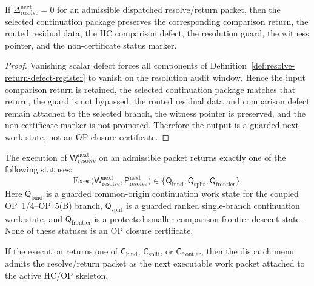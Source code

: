 \begin{lemma}
\label{lem:zero-resolve-return-defect-preserves-selected-continuation-data}
If \(\Delta_{\mathrm{resolve}}^{\mathrm{next}}=0\) for an admissible dispatched resolve/return packet, then the selected continuation package preserves the corresponding comparison return, the routed residual data, the HC comparison defect, the resolution guard, the witness pointer, and the non-certificate status marker.
\end{lemma}

\begin{proof}
Vanishing scalar defect forces all components of Definition~\ref{def:resolve-return-defect-register} to vanish on the resolution audit window. Hence the input comparison return is retained, the selected continuation package matches that return, the guard is not bypassed, the routed residual data and comparison defect remain attached to the selected branch, the witness pointer is preserved, and the non-certificate marker is not promoted. Therefore the output is a guarded next work state, not an OP closure certificate.
\end{proof}

\begin{definition}
\label{def:r21-resolve-return-output}
The execution of \(\mathsf W_{\mathrm{resolve}}^{\mathrm{next}}\) on an admissible packet returns exactly one of the following statuses:
\[
\mathrm{Exec}\bigl(\mathsf W_{\mathrm{resolve}}^{\mathrm{next}},
 \mathsf P_{\mathrm{resolve}}^{\mathrm{next}}\bigr)
\in
\{\mathsf Q_{\mathrm{bind}},\mathsf Q_{\mathrm{split}},\mathsf Q_{\mathrm{frontier}}\}.
\]
Here \(\mathsf Q_{\mathrm{bind}}\) is a guarded common-origin continuation work state for the coupled OP~1/4--OP~5(B) branch, \(\mathsf Q_{\mathrm{split}}\) is a guarded ranked single-branch continuation work state, and \(\mathsf Q_{\mathrm{frontier}}\) is a protected smaller comparison-frontier descent state. None of these statuses is an OP closure certificate.
\end{definition}

\begin{proposition}
\label{prop:dispatched-resolve-return-packet-admissible}
If the execution returns one of \(\mathsf C_{\mathrm{bind}}\), \(\mathsf C_{\mathrm{split}}\), or \(\mathsf C_{\mathrm{frontier}}\), then the dispatch menu admits the resolve/return packet as the next executable work packet attached to the active HC/OP skeleton.
\end{proposition}

